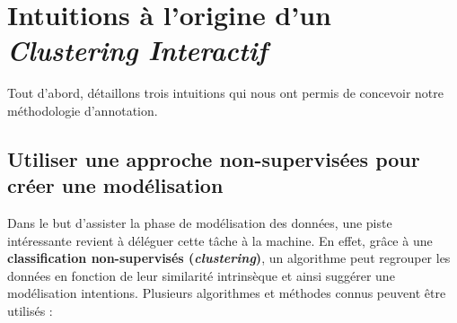 \section{Intuitions à l'origine d'un \textit{Clustering Interactif}}
\label{section:3.1-INTUITIONS-ORIGINES}

	Tout d'abord, détaillons trois intuitions qui nous ont permis de concevoir notre méthodologie d'annotation.
	
	
	\subsection{Utiliser une approche non-supervisées pour créer une modélisation}
	\label{section:3.1.1-INTUITIONS-ORIGINES-NON-SUPERVISEES}
	
		Dans le but d'assister la phase de modélisation des données, une piste intéressante revient à déléguer cette tâche à la machine.
		En effet, grâce à une \textbf{classification non-supervisés (\textit{clustering})}, un algorithme peut regrouper les données en fonction de leur similarité intrinsèque et ainsi suggérer une modélisation intentions.
		Plusieurs algorithmes et méthodes connus peuvent être utilisés :
		
